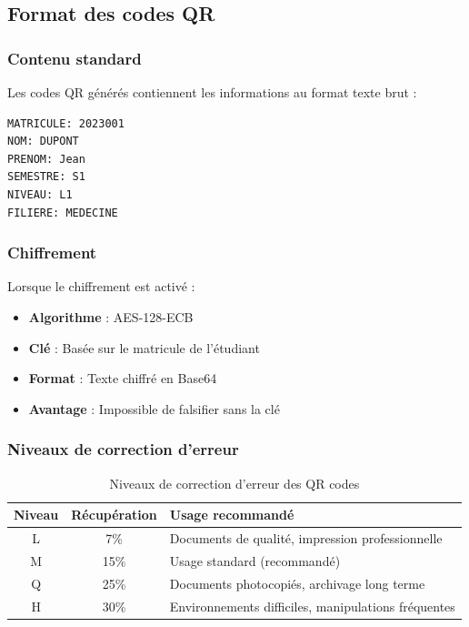 \subsection{Format des codes QR}

\subsubsection{Contenu standard}

Les codes QR générés contiennent les informations au format texte brut :

\begin{verbatim}
MATRICULE: 2023001
NOM: DUPONT
PRENOM: Jean
SEMESTRE: S1
NIVEAU: L1
FILIERE: MEDECINE
\end{verbatim}

\subsubsection{Chiffrement}

Lorsque le chiffrement est activé :

\begin{itemize}[leftmargin=*]
    \item \textbf{Algorithme} : AES-128-ECB
    \item \textbf{Clé} : Basée sur le matricule de l'étudiant
    \item \textbf{Format} : Texte chiffré en Base64
    \item \textbf{Avantage} : Impossible de falsifier sans la clé
\end{itemize}

\subsubsection{Niveaux de correction d'erreur}

\begin{table}[h]
\centering
\begin{tabular}{|c|c|p{8cm}|}
\hline
\textbf{Niveau} & \textbf{Récupération} & \textbf{Usage recommandé} \\
\hline
L & 7\% & Documents de qualité, impression professionnelle \\
\hline
M & 15\% & Usage standard (recommandé) \\
\hline
Q & 25\% & Documents photocopiés, archivage long terme \\
\hline
H & 30\% & Environnements difficiles, manipulations fréquentes \\
\hline
\end{tabular}
\caption{Niveaux de correction d'erreur des QR codes}
\end{table}

